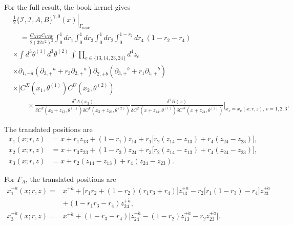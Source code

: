 \documentclass[11pt]{article}
\numberwithin{equation}{section}
\numberwithin{figure}{section}
\numberwithin{table}{section}
\begin{document}
For the full result, the book kernel gives
{\small
\begin{equation}\label{eq-product2book}
\begin{aligned}
&\left.\frac12\{\mathcal I,\mathcal I,A,B\}^{\gamma,0}(x)\right|_{\Gamma_{\mathrm{book}}}\\
&\quad=\frac{C_{XYZ}C_{UVW}}{2(32\pi^2)^2}
\int_0^1dr_1\int_0^1dr_3\int_0^1dr_2\int_0^{1-r_2}dr_4\,
(1-r_2-r_4)\\
&\times\int d^3\theta^{(1)}d^3\theta^{(2)}\,
\int\prod_{e\in\{13,14,23,24\}}d^4z_e\\
&\times\partial_{1,+\dot a}
(\partial_{3,+}{}^{\dot a}+r_3\partial_{2,+}{}^{\dot a})
\partial_{2,+\dot b}
(\partial_{3,+}{}^{\dot b}+r_1\partial_{1,+}{}^{\dot b})\\
&\times\Bigg[
C^X(x_1,\theta^{(1)})C^U(x_2,\theta^{(2)})\\
&\qquad\times
\frac{\delta^2A(x_3)}{
\delta C^Y(x_3+z_{13},\theta^{(1)})
\delta C^V(x_3+z_{23},\theta^{(2)})}
\frac{\delta^2B(x)}{
\delta C^Z(x+z_{14},\theta^{(1)})
\delta C^W(x+z_{24},\theta^{(2)})}
\Bigg]_{x_v=x_v(x;r,z),\,v=1,2,3} .
\end{aligned}
\end{equation}
}

The translated positions are
\begin{equation*}
\begin{aligned}
x_1(x;r,z)&=x+r_1z_{13}+(1-r_1)z_{14}
+r_1\big[r_2(z_{14}-z_{13})+r_4(z_{24}-z_{23})\big],\\
x_2(x;r,z)&=x+r_3z_{23}+(1-r_3)z_{24}
+r_3\big[r_2(z_{14}-z_{13})+r_4(z_{24}-z_{23})\big],\\
x_3(x;r,z)&=x+r_2(z_{14}-z_{13})+r_4(z_{24}-z_{23}).
\end{aligned}
\end{equation*}

For $\Gamma_A$, the translated positions are
\begin{equation*}
\begin{aligned}
x_1^{+\dot a}(x;r,z)
={}&x^{+\dot a}+\big[r_1r_2+(1-r_2)(r_1r_3+r_4)\big]z_{13}^{+\dot a}
-r_2\big[r_1(1-r_3)-r_4\big]z_{23}^{+\dot a}\\
&+(1-r_1r_3-r_4)z_{24}^{+\dot a},\\
x_3^{+\dot a}(x;r,z)
={}&x^{+\dot a}+(1-r_3-r_4)
\big[z_{24}^{+\dot a}-(1-r_2)z_{13}^{+\dot a}-r_2z_{23}^{+\dot a}\big].
\end{aligned}
\end{equation*}
\end{document}
